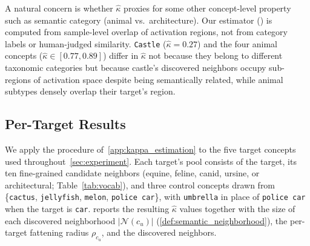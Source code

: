 
A natural concern is whether $\hat\kappa$ proxies for some other concept-level property such as semantic category (animal vs.\ architecture). Our estimator () is computed from sample-level overlap of activation regions, not from category labels or human-judged similarity. \texttt{Castle} ($\hat\kappa = 0.27$) and the four animal concepts ($\hat\kappa \in [0.77, 0.89]$) differ in $\hat\kappa$ not because they belong to different taxonomic categories but because castle's discovered neighbors 
occupy sub-regions of activation space despite being semantically related, while animal subtypes 
densely overlap their target's region.

\subsection{Per-Target Results}
\label{app:kappa_per_target}
We apply the procedure of~\cref{app:kappa_estimation} to the five target concepts used throughout~\cref{sec:experiment}. Each target's pool consists of the target, its ten fine-grained candidate neighbors (equine, feline, canid, ursine, or architectural; Table~\ref{tab:vocab}), and three control concepts drawn from \{\texttt{cactus}, \texttt{jellyfish}, \texttt{melon}, \texttt{police car}\}, with \texttt{umbrella} in place of \texttt{police car} when the target is \texttt{car}. 
 reports the resulting $\hat\kappa$ values together with the size of each discovered neighborhood $|\mathcal{N}(c_u)|$ (\cref{def:semantic_neighborhood}), the per-target fattening radius $\rho_{c_u}$, and the discovered neighbors.

